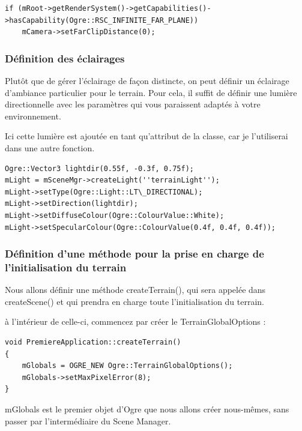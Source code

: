 \begin{lstlisting}[caption={Vérification et réglages de vue à l'infini}]
if (mRoot->getRenderSystem()->getCapabilities()->hasCapability(Ogre::RSC_INFINITE_FAR_PLANE))
    mCamera->setFarClipDistance(0);
\end{lstlisting}




\subsubsection{Définition des éclairages}
Plutôt que de gérer l'éclairage de façon distincte, on peut définir un éclairage d'ambiance particulier pour le terrain. Pour cela, il suffit de définir une lumière directionnelle avec les paramètres qui vous paraissent adaptés à votre environnement. 

Ici cette lumière est ajoutée en tant qu'attribut de la classe, car je l'utiliserai dans une autre fonction.

\begin{lstlisting}[caption={Définition de l'éclairage pour le terrain}]
Ogre::Vector3 lightdir(0.55f, -0.3f, 0.75f);
mLight = mSceneMgr->createLight(''terrainLight'');
mLight->setType(Ogre::Light::LT\_DIRECTIONAL);
mLight->setDirection(lightdir);
mLight->setDiffuseColour(Ogre::ColourValue::White);
mLight->setSpecularColour(Ogre::ColourValue(0.4f, 0.4f, 0.4f));
\end{lstlisting}




\subsubsection{Définition d'une méthode pour la prise en charge de l'initialisation du terrain}

Nous allons définir une méthode createTerrain(), qui sera appelée dans createScene() et qui prendra en charge toute l'initialisation du terrain.

à l'intérieur de celle-ci, commencez par créer le TerrainGlobalOptions :

\begin{lstlisting}[caption={Méthode pour la prise en charge de l'initialisation du terrain}]
void PremiereApplication::createTerrain()
{
    mGlobals = OGRE_NEW Ogre::TerrainGlobalOptions();
    mGlobals->setMaxPixelError(8);
}
\end{lstlisting}

mGlobals est le premier objet d'Ogre que nous allons créer nous-mêmes, sans passer par l'intermédiaire du Scene Manager.

